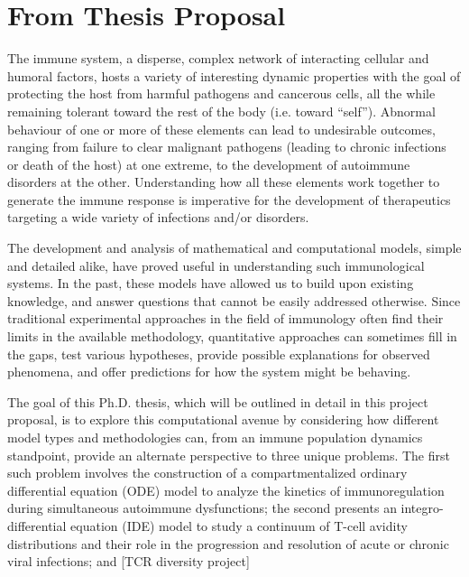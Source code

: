 \section*{From Thesis Proposal}

The immune system, a disperse, complex network of interacting cellular and humoral factors, hosts a variety of interesting dynamic properties with the goal of protecting the host from harmful pathogens and cancerous cells, all the while remaining tolerant toward the rest of the body (i.e. toward ``self''). Abnormal behaviour of one or more of these elements can lead to undesirable outcomes, ranging from failure to clear malignant pathogens (leading to chronic infections or death of the host) at one extreme, to the development of autoimmune disorders at the other. Understanding how all these elements work together to generate the immune response is imperative for the development of therapeutics targeting a wide variety of infections and/or disorders.

The development and analysis of mathematical and computational models, simple and detailed alike, have proved useful in understanding such immunological systems. In the past, these models have allowed us to build upon existing knowledge, and answer questions that cannot be easily addressed otherwise. Since traditional experimental approaches in the field of immunology often find their limits in the available methodology, quantitative approaches can sometimes fill in the gaps, test various hypotheses, provide possible explanations for observed phenomena, and offer predictions for how the system might be behaving.

The goal of this Ph.D. thesis, which will be outlined in detail in this project proposal, is to explore this computational avenue by considering how different model types and methodologies can, from an immune population dynamics standpoint, provide an alternate perspective to three unique problems. The first such problem involves the construction of a compartmentalized ordinary differential equation (ODE) model to analyze the kinetics of immunoregulation during simultaneous autoimmune dysfunctions; the second presents an integro-differential equation (IDE) model to study a continuum of T-cell avidity distributions and their role in the progression and resolution of acute or chronic viral infections; and [TCR diversity project]


